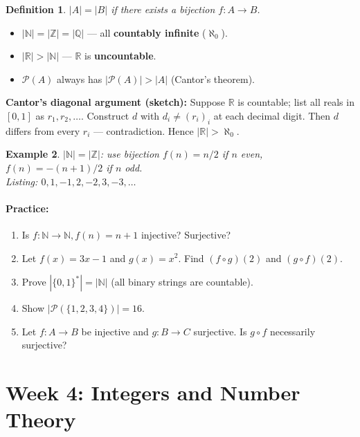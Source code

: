 \documentclass[11pt]{article}
\newtheorem{definition}{Definition}[section]
\newtheorem{example}[definition]{Example}
\newenvironment{practice}{\paragraph*{\textbf{Practice:}}}{}
\newcommand{\Z}{\mathbb{Z}}
\newcommand{\N}{\mathbb{N}}
\newcommand{\R}{\mathbb{R}}
\begin{document}
\begin{definition}
$|A|=|B|$ if there exists a bijection $f:A\to B$.
\end{definition}

\begin{tcolorbox}[keybox={Cardinality facts}]
\begin{itemize}[nosep]
  \item $|\N|=|\Z|=|\mathbb{Q}|$ — all \textbf{countably infinite} ($\aleph_0$).
  \item $|\R|>|\N|$ — $\R$ is \textbf{uncountable}.
  \item $\mathcal{P}(A)$ always has $|{\mathcal{P}(A)}|>|A|$ (Cantor's theorem).
\end{itemize}
\end{tcolorbox}

\textbf{Cantor's diagonal argument (sketch):} Suppose $\R$ is countable; list all reals in $[0,1]$ as $r_1,r_2,\ldots$. Construct $d$ with $d_i\ne (r_i)_i$ at each decimal digit. Then $d$ differs from every $r_i$ — contradiction. Hence $|\R|>\aleph_0$.

\begin{example}
$|\N|=|\Z|$: use bijection $f(n)=n/2$ if $n$ even, $f(n)=-(n+1)/2$ if $n$ odd.\\
Listing: $0,1,-1,2,-2,3,-3,\ldots$
\end{example}

\begin{practice}
\begin{enumerate}[nosep,label=\arabic*.]
  \item Is $f:\N\to\N, f(n)=n+1$ injective? Surjective?
  \item Let $f(x)=3x-1$ and $g(x)=x^2$. Find $(f\circ g)(2)$ and $(g\circ f)(2)$.
  \item Prove $|\{0,1\}^*|=|\N|$ (all binary strings are countable).
  \item Show $|\mathcal{P}(\{1,2,3,4\})|=16$.
  \item Let $f:A\to B$ be injective and $g:B\to C$ surjective. Is $g\circ f$ necessarily surjective?
\end{enumerate}
\end{practice}

\newpage
\section{Week 4: Integers and Number Theory}
\setcounter{definition}{0}
\end{document}
